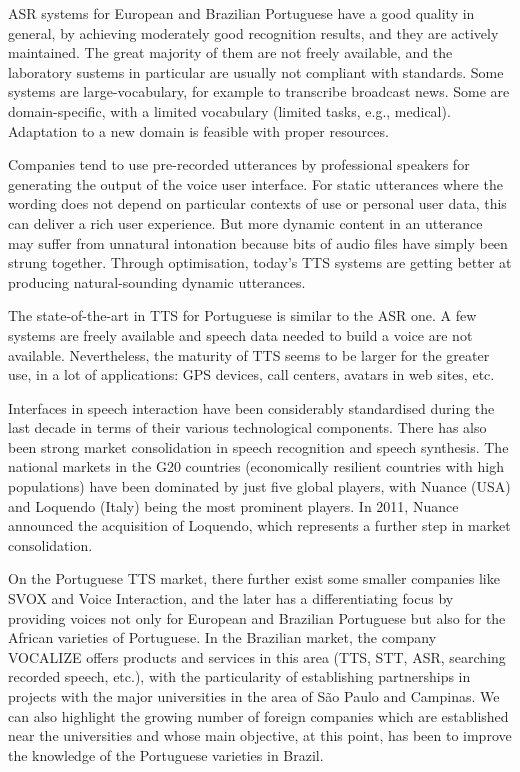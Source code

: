 \begin{multicols}{2}
ASR systems for European and Brazilian Portuguese have a good quality in general, by achieving moderately good recognition results, and they are actively maintained. The great majority of them are not freely available, and the laboratory sustems in particular are usually not compliant with standards. Some systems are large-vocabulary, for example to transcribe broadcast news. Some are domain-specific, with a limited vocabulary (limited tasks, e.g., medical). Adaptation to a new domain is feasible with proper resources.


Companies tend to use pre-recorded utterances by professional speakers for generating the output of the voice user interface. For static utterances where the wording does not depend on particular contexts of use or personal user data, this can deliver a rich user experience. But more dynamic content in an utterance may suffer from unnatural intonation because bits of audio files have simply been strung together. Through optimisation, today’s TTS systems are getting better at producing natural-sounding dynamic utterances.

The state-of-the-art in TTS for Portuguese is similar to the ASR one. A few systems are freely available and speech data needed to build a voice are not available. Nevertheless, the maturity of TTS seems to be larger for the greater use, in a lot of applications: GPS devices, call centers, avatars in web sites, etc.

Interfaces in speech interaction have been considerably standardised during the last decade in terms of their various technological components. There has also been strong market consolidation in speech recognition and speech synthesis. The national markets in the G20 countries (economically resilient countries with high populations) have been dominated by just five global players, with Nuance (USA) and Loquendo (Italy) being the most prominent players. In 2011, Nuance announced the acquisition of Loquendo, which represents a further step in market consolidation.

On the Portuguese TTS market, there further exist some smaller companies like SVOX and Voice Interaction, and the later has a differentiating focus by providing voices not only for European and Brazilian Portuguese but also for the African varieties of Portuguese. In the Brazilian market, the company VOCALIZE offers products and services in this area (TTS, STT, ASR, searching recorded speech, etc.), with the particularity of establishing partnerships in projects with the major universities in the area of São Paulo and Campinas\cite{neto}. We can also highlight the growing number of foreign companies which are established near the universities and whose main objective, at this point, has been to improve the knowledge of the Portuguese varieties in Brazil.


\end{multicols}
